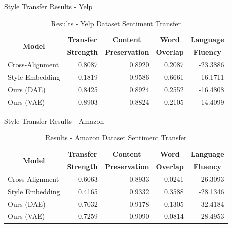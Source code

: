 \documentclass[aspectratio=169]{beamer}
\newcommand{\tabh}[1]{\multicolumn{1}{c|}{\textbf{#1}}}
\newcommand{\tabc}[2]{\multicolumn{1}{|c|}{\multirow{#1}{*}{\textbf{#2}}}}
\begin{document}
\begin{frame}{Style Transfer Results - Yelp}
	\begin{table}[ht]
		\centering
		\begin{tabular}{| l | r | r | r | r |}
			\hline
			\tabc{2}{Model}                       & \tabh{Transfer} & \tabh{Content}      & \tabh{Word}    & \tabh{Language} \\
			                                      & \tabh{Strength} & \tabh{Preservation} & \tabh{Overlap} & \tabh{Fluency}  \\
			\hline
			\hline
			Cross-Alignment \citep{shen2017style} & 0.8087          & 0.8920              & 0.2087         & -23.3886        \\
			\hline
			Style Embedding \citep{fu2017style}   & 0.1819          & 0.9586              & 0.6661         & -16.1711        \\
			\hline
			Ours (DAE)                            & 0.8425          & 0.8924              & 0.2552         & -16.4808        \\
			\hline
			Ours (VAE)                            & 0.8903          & 0.8824              & 0.2105         & -14.4099        \\
			\hline
		\end{tabular}
		\caption{Results - Yelp Dataset Sentiment Transfer}
		\label{tab:comparison-previous}
	\end{table}
\end{frame}

\begin{frame}{Style Transfer Results - Amazon}
	\begin{table}[ht]
		\centering
		\begin{tabular}{| l | r | r | r | r |}
			\hline
			\tabc{2}{Model}                       & \tabh{Transfer} & \tabh{Content}      & \tabh{Word}    & \tabh{Language} \\
			                                      & \tabh{Strength} & \tabh{Preservation} & \tabh{Overlap} & \tabh{Fluency}  \\
			\hline
			\hline
			Cross-Alignment \citep{shen2017style} & 0.6063          & 0.8933              & 0.0241         & -26.3093        \\
			\hline
			Style Embedding \citep{fu2017style}   & 0.4165          & 0.9332              & 0.3588         & -28.1346        \\
			\hline
			Ours (DAE)                            & 0.7032          & 0.9178              & 0.1305         & -32.4184        \\
			\hline
			Ours (VAE)                            & 0.7259          & 0.9090              & 0.0814         & -28.4953        \\
			\hline
		\end{tabular}
		\caption{Results - Amazon Dataset Sentiment Transfer}
		\label{tab:comparison-previous-ama}
	\end{table}
\end{frame}
\end{document}
